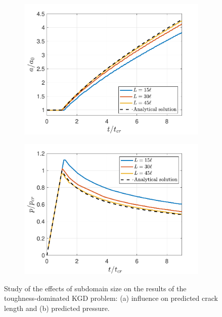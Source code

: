 \begin{figure}[!htbp]
\centering
\begin{subfigure}{.5\textwidth}
  \centering
  \includegraphics[width=\linewidth]{img/toughness_prob/length_L_analysis}
  \caption{}
  \label{fig:adjusting_L_a}
\end{subfigure}%
\begin{subfigure}{.5\textwidth}
  \centering
  \includegraphics[width=\linewidth]{img/toughness_prob/pressure_L_analysis}
  \caption{}
  \label{fig:adjusting_L_p}
\end{subfigure}
  \caption{Study of the effects of subdomain size on the results of the toughness-dominated KGD problem:  (a) influence on predicted crack length and (b) predicted pressure. }
  \label{fig:adjusting_L}
\end{figure}
\FloatBarrier

